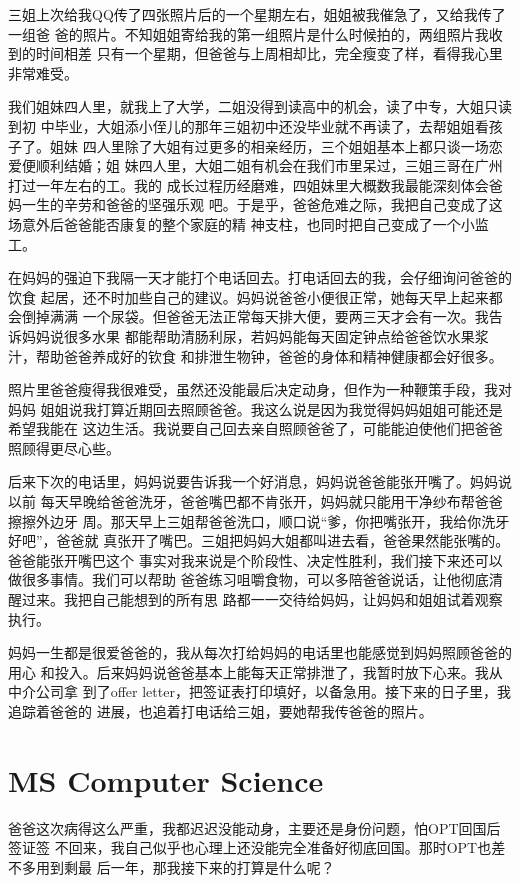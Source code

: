 \documentclass[12pt]{book}
\begin{document}
三姐上次给我QQ传了四张照片后的一个星期左右，姐姐被我催急了，又给我传了一组爸
爸的照片。不知姐姐寄给我的第一组照片是什么时候拍的，两组照片我收到的时间相差
只有一个星期，但爸爸与上周相却比，完全瘦变了样，看得我心里非常难受。

我们姐妹四人里，就我上了大学，二姐没得到读高中的机会，读了中专，大姐只读到初
中毕业，大姐添小侄儿的那年三姐初中还没毕业就不再读了，去帮姐姐看孩子了。姐妹
四人里除了大姐有过更多的相亲经历，三个姐姐基本上都只谈一场恋爱便顺利结婚；姐
妹四人里，大姐二姐有机会在我们市里呆过，三姐三哥在广州打过一年左右的工。我的
成长过程历经磨难，四姐妹里大概数我最能深刻体会爸妈一生的辛劳和爸爸的坚强乐观
吧。于是乎，爸爸危难之际，我把自己变成了这场意外后爸爸能否康复的整个家庭的精
神支柱，也同时把自己变成了一个小监工。

在妈妈的强迫下我隔一天才能打个电话回去。打电话回去的我，会仔细询问爸爸的饮食
起居，还不时加些自己的建议。妈妈说爸爸小便很正常，她每天早上起来都会倒掉满满
一个尿袋。但爸爸无法正常每天排大便，要两三天才会有一次。我告诉妈妈说很多水果
都能帮助清肠利尿，若妈妈能每天固定钟点给爸爸饮水果浆汁，帮助爸爸养成好的钦食
和排泄生物钟，爸爸的身体和精神健康都会好很多。

照片里爸爸瘦得我很难受，虽然还没能最后决定动身，但作为一种鞭策手段，我对妈妈
姐姐说我打算近期回去照顾爸爸。我这么说是因为我觉得妈妈姐姐可能还是希望我能在
这边生活。我说要自己回去亲自照顾爸爸了，可能能迫使他们把爸爸照顾得更尽心些。

后来下次的电话里，妈妈说要告诉我一个好消息，妈妈说爸爸能张开嘴了。妈妈说以前
每天早晚给爸爸洗牙，爸爸嘴巴都不肯张开，妈妈就只能用干净纱布帮爸爸擦擦外边牙
周。那天早上三姐帮爸爸洗口，顺口说“爹，你把嘴张开，我给你洗牙好吧”，爸爸就
真张开了嘴巴。三姐把妈妈大姐都叫进去看，爸爸果然能张嘴的。爸爸能张开嘴巴这个
事实对我来说是个阶段性、决定性胜利，我们接下来还可以做很多事情。我们可以帮助
爸爸练习咀嚼食物，可以多陪爸爸说话，让他彻底清醒过来。我把自己能想到的所有思
路都一一交待给妈妈，让妈妈和姐姐试着观察执行。

妈妈一生都是很爱爸爸的，我从每次打给妈妈的电话里也能感觉到妈妈照顾爸爸的用心
和投入。后来妈妈说爸爸基本上能每天正常排泄了，我暂时放下心来。我从中介公司拿
到了offer letter，把签证表打印填好，以备急用。接下来的日子里，我追踪着爸爸的
进展，也追着打电话给三姐，要她帮我传爸爸的照片。
\section{MS Computer Science}
\label{sec-9-26}

爸爸这次病得这么严重，我都迟迟没能动身，主要还是身份问题，怕OPT回国后签证签
不回来，我自己似乎也心理上还没能完全准备好彻底回国。那时OPT也差不多用到剩最
后一年，那我接下来的打算是什么呢？
\end{document}
